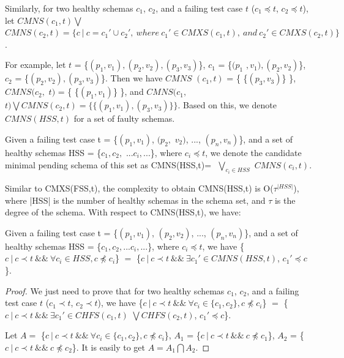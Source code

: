 {Similarly, for two healthy schemas $c_{1}$, $c_{2}$, and a failing test case $t$ ($c_{1} \preceq t$, $c_{2} \preceq t$), let $CMNS(c_{1}, t) \bigvee $ $CMNS(c_{2}, t)  = \{ c\ |\ c = c_{1}' \cup c_{2}',\ where\ c_{1}' \in CMXS(c_{1}, t),\ and\ c_{2}' \in CMXS(c_{2}, t) \}$.

For example, let $t$ = \{$(p_{1},v_{1}), (p_{2}, v_{2}), (p_{3}, v_{3})$\}, $c_{1}$ = \{$(p_{1}$ $, v_{1}), (p_{2}, v_{2})$\}, $c_{2}$ = \{$(p_{2}, v_{2}), (p_{3}, v_{3})$\}. Then we have $CMNS$ $(c_{1}, t)$ = \{ \{$(p_{3}, v_{3})$\} \}, $CMNS(c_{2},$ $ t)$ = \{ \{$(p_{1}, v_{1})$\} \}, and  $CMNS(c_{1},$ $ t) \bigvee CMNS(c_{2}, t) = \{ \{(p_{1}, v_{1}), (p_{3}, v_{3})\} \} $. Based on this, we denote $CMNS(HSS,t)$ for a set of faulty schemas.


\begin{definition}
Given a failing test case t = \{$(p_{1}, v_{1})$, $(p_{2}, $ $v_{2})$, ..., $(p_{n}, v_{n})$\}, and a set of healthy schemas HSS = \{$c_{1} , c_{2},$ $  ...c_{i}, ...$\}, where $ c_{i} \preceq t$, we denote the candidate minimal pending schema of this set as CMNS(HSS,t)= $ $ $\bigvee_{c_{i}\in HSS}$ $ CMNS(c_{i}, t)$.
\end{definition}

Similar to CMXS(FSS,t), the complexity to obtain CMNS(HSS,t) is O($\tau^{|HSS|}$), where |HSS| is the number of healthy schemas in the schema set, and $\tau$ is the degree of the schema. With respect to CMNS(HSS,t), we have:

\begin{proposition}\label{pro:superofCMNS2}
Given a failing test case t = \{$(p_{1}, v_{1})$, $(p_{2}, v_{2})$, ..., $(p_{n}, v_{n})$\}, and a set of healthy schemas HSS = \{$c_{1} , c_{2}, ... c_{i}, ...$\}, where $ c_{i} \preceq t$,  we have \{$c\ |\ c \prec t\ \&\&\ \forall c_{i} \in HSS, c \npreceq c_{i} $\} $=$  \{$ c\ |\ c \prec t \ \&\& \ \exists c_{1}' \in CMNS(HSS, t)$, $c_{1}' \preceq c$\}.
\end{proposition}

\begin{proof}
We just need to prove that for two healthy schemas $c_{1}$, $c_{2}$, and a failing test case $t$ ($c_{1} \prec t$, $c_{2} \prec t$), we have \{$c\ |\ c \prec t\ \&\&\ \forall c_{i} \in \{c_{1}, c_{2}\}, c \npreceq c_{i} $\} $=$  \{$ c\ |\ c \prec t \ \&\&\  \exists c_{1}' \in CHFS(c_{1}, t)$ $ \bigvee CHFS(c_{2}, t)$, $c_{1}' \preceq c$\}.

Let $A = $ \{$c\ |\ c \prec t\ \&\&\ \forall c_{i} \in \{c_{1}, c_{2}\}, c \npreceq c_{i} $\}, $A_{1}$ = \{$c\ |\ c \prec t\ \&\&\  c \npreceq c_{1} $\}, $A_{2}$ = \{$c\ |\ c \prec t\ \&\&\  c \npreceq c_{2} $\}. It is easily to get $A = A_{1} \bigcap A_{2}$.


\end{proof}}
